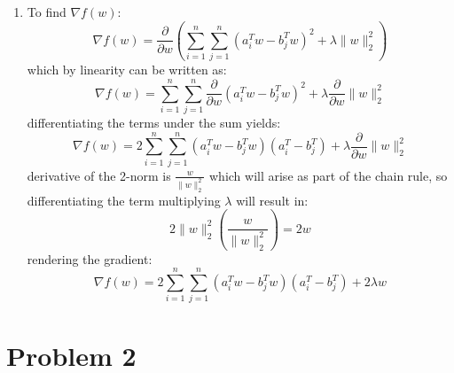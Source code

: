 \documentclass[12pt]{article}
\begin{document}
\begin{enumerate}[label=(\alph*)]
  \item To find \(\nabla f(w)\):
		\[
			\nabla f(w) = \frac{\partial}{\partial w}
			\left(\sum_{i=1}^n\sum_{j=1}^n (a_i^Tw - b_j^Tw)^2 + \lambda \lVert
			w \rVert_2^2\right)
		\]
		which by linearity can be written as:
		\[
			\nabla f(w) = \sum_{i=1}^n\sum_{j=1}^n
			\frac{\partial}{\partial w} (a_i^Tw - b_j^Tw)^2 +
			\lambda \frac{\partial}{\partial w} \lVert w \rVert_2^2
		\]
		differentiating the terms under the sum yields:
		\[
			\nabla f(w) = 2\sum_{i=1}^n\sum_{j=1}^n
			(a_i^Tw - b_j^Tw)(a_i^T - b_j^T) +
			\lambda \frac{\partial}{\partial w} \lVert w \rVert_2^2
		\]
		derivative of the 2-norm is \(\frac{w}{\lVert w \rVert_2^2}\) which
		will arise as part of the chain rule, so differentiating the term
		multiplying \(\lambda\) will result in:
		\[
			2 \lVert w \rVert_2^2 \left( \frac{w}{\lVert w \rVert_2^2} \right) = 2w
		\]
		rendering the gradient:
		\[
			\nabla f(w) = 2\sum_{i=1}^n\sum_{j=1}^n
			(a_i^Tw - b_j^Tw)(a_i^T - b_j^T) +
			2\lambda w
		\]


\end{enumerate}

\section*{Problem 2}
\end{document}

